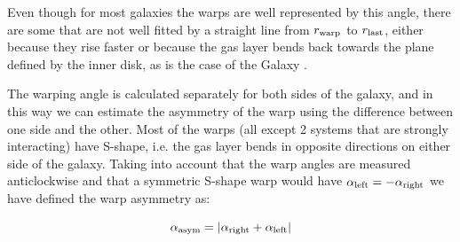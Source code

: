 \documentclass{aa}
\begin{document}
Even though for most galaxies the warps are well represented by this
angle, there are 
some that are not well fitted by a straight line from $r_{\rm warp}$ to
$r_{\rm last}$, either because they rise faster or because the gas layer
bends back towards the plane defined by the inner disk, as is the case
of the Galaxy \cite{bu}.

The warping angle is calculated separately for both sides of the galaxy, and in
this way we can estimate the asymmetry of the warp using the
difference between one side and the other. Most of the warps (all
except 2 systems that are strongly interacting) have S-shape, i.e.
the gas layer bends in opposite directions on either
side of the galaxy. Taking into account that the warp angles are
measured anticlockwise and that a symmetric S-shape warp would have
$\alpha_{\rm left}=-\alpha_{\rm right}$ we have defined the warp asymmetry as:

\begin{equation}
\alpha_{\rm asym}=|\alpha_{\rm right}+\alpha_{\rm left}|
\end{equation}
\end{document}
